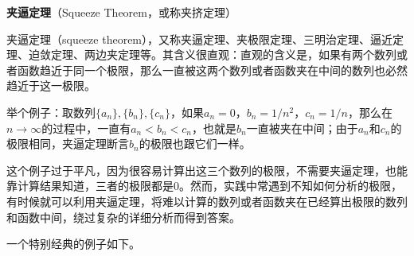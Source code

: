 
\begin{issues}
\issueDraft
\end{issues}
\textbf{夹逼定理}（Squeeze Theorem，或称夹挤定理）



夹逼定理（squeeze theorem），又称夹逼定理、夹极限定理、三明治定理、逼近定理、迫敛定理、两边夹定理等。其含义很直观：直观的含义是，如果有两个数列或者函数趋近于同一个极限，那么一直被这两个数列或者函数夹在中间的数列也必然趋近于这一极限。

举个例子：取数列$\{a_n\}, \{b_n\}, \{c_n\}$，如果$a_n=0$，$b_n=1/n^2$，$c_n=1/n$，那么在$n\to\infty$的过程中，一直有$a_n<b_n<c_n$，也就是$b_n$一直被夹在中间；由于$a_n$和$c_n$的极限相同，夹逼定理断言$b_n$的极限也跟它们一样。


这个例子过于平凡，因为很容易计算出这三个数列的极限，不需要夹逼定理，也能靠计算结果知道，三者的极限都是$0$。然而，实践中常遇到不知如何分析的极限，有时候就可以利用夹逼定理，将难以计算的数列或者函数夹在已经算出极限的数列和函数中间，绕过复杂的详细分析而得到答案。


一个特别经典的例子如下。

